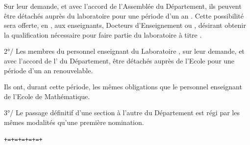Sur leur demande, et avec l'accord de l'Assemblée du Département, ils peuvent être détachés auprès du laboratoire pour une période d'un an . Cette possibilité sera offerte, en , aux enseignants, Docteurs d'Enseignement ou , désirant obtenir la qualification nécessaire pour faire partie du laboratoire à titre .

2°/ Les membres du personnel enseignant du Laboratoire , sur leur demande, et avec l'accord de l' du Département, être détachés auprès de l'Ecole pour une période d'un an renouvelable.


Ils ont, durant cette période, les mêmes obligations que le personnel enseignant de l'Ecole de Mathématique.

3°/ Le passage définitif d'une section à l'autre du Département est régi par les mêmes modalités qu'une première nomination.

\begin{center}\texttt{+=+=+=+=+=+}\end{center}
